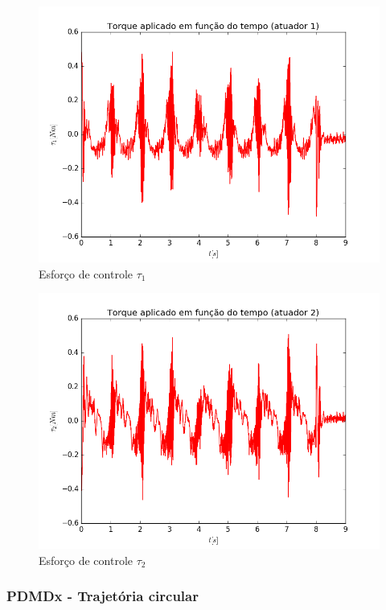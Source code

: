\documentclass[]{politex}
\begin{document}
\begin{multicols}{2}
\begin{figure}[H]
	\centering
	\includegraphics[scale=0.39]{../../../Experimental/Aquisicoes/PIDx_circulo/tau1.png}  
	\caption{Esforço de controle $\tau_1$}
	\label{fig:PIDx_circulo_tau1}
\end{figure}
\begin{figure}[H]
	\centering
	\includegraphics[scale=0.39]{../../../Experimental/Aquisicoes/PIDx_circulo/tau2.png}  
	\caption{Esforço de controle $\tau_2$}
	\label{fig:PIDx_circulo_tau2}
\end{figure}
\end{multicols}

\subsubsection{PDMDx - Trajetória circular}
\end{document}
